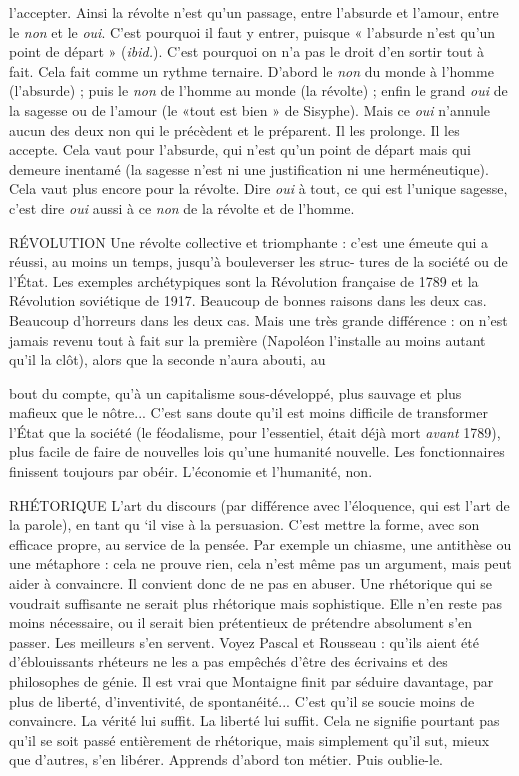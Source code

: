 l’accepter. Ainsi la révolte n’est qu’un passage, entre l’absurde et l’amour, entre
le {\it non} et le {\it oui}. C’est pourquoi il faut y entrer, puisque « l'absurde n’est qu’un
point de départ » ({\it ibid.}). C’est pourquoi on n’a pas le droit d’en sortir tout à
fait. Cela fait comme un rythme ternaire. D’abord le {\it non} du monde à l’homme
(l'absurde) ; puis le {\it non} de l’homme au monde (la révolte) ; enfin le grand {\it oui}
de la sagesse ou de l’amour (le «tout est bien » de Sisyphe). Mais ce {\it oui}
n’annule aucun des deux non qui le précèdent et le préparent. Il les prolonge.
Il les accepte. Cela vaut pour l’absurde, qui n’est qu’un point de départ mais
qui demeure inentamé (la sagesse n’est ni une justification ni une herméneutique).
Cela vaut plus encore pour la révolte. Dire {\it oui} à tout, ce qui est l’unique
sagesse, c’est dire {\it oui} aussi à ce {\it non} de la révolte et de l’homme.

RÉVOLUTION Une révolte collective et triomphante : c’est une émeute qui
a réussi, au moins un temps, jusqu’à bouleverser les struc-
tures de la société ou de l’État. Les exemples archétypiques sont la Révolution
française de 1789 et la Révolution soviétique de 1917. Beaucoup de bonnes
raisons dans les deux cas. Beaucoup d’horreurs dans les deux cas. Mais une très
grande différence : on n’est jamais revenu tout à fait sur la première (Napoléon
l'installe au moins autant qu’il la clôt), alors que la seconde n’aura abouti, au

bout du compte, qu’à un capitalisme sous-développé, plus sauvage et plus
mafieux que le nôtre... C’est sans doute qu’il est moins difficile de transformer
l’État que la société (le féodalisme, pour l'essentiel, était déjà mort {\it avant} 1789),
plus facile de faire de nouvelles lois qu’une humanité nouvelle. Les fonctionnaires
finissent toujours par obéir. L'économie et l'humanité, non.

RHÉTORIQUE L’art du discours (par différence avec l’éloquence, qui est
l’art de la parole), en tant qu ‘il vise à la persuasion. C’est
mettre la forme, avec son efficace propre, au service de la pensée. Par exemple
un chiasme, une antithèse ou une métaphore : cela ne prouve rien, cela n’est
même pas un argument, mais peut aider à convaincre. Il convient donc de ne
pas en abuser. Une rhétorique qui se voudrait suffisante ne serait plus rhétorique
mais sophistique. Elle n’en reste pas moins nécessaire, ou il serait bien
prétentieux de prétendre absolument s’en passer. Les meilleurs s’en servent.
Voyez Pascal et Rousseau : qu’ils aient été d’éblouissants rhéteurs ne les a pas
empêchés d’être des écrivains et des philosophes de génie. Il est vrai que Montaigne
finit par séduire davantage, par plus de liberté, d’inventivité, de spontanéité...
C’est qu’il se soucie moins de convaincre. La vérité lui suffit. La liberté
lui suffit. Cela ne signifie pourtant pas qu’il se soit passé entièrement de rhétorique,
mais simplement qu’il sut, mieux que d’autres, s’en libérer. Apprends
d’abord ton métier. Puis oublie-le.

